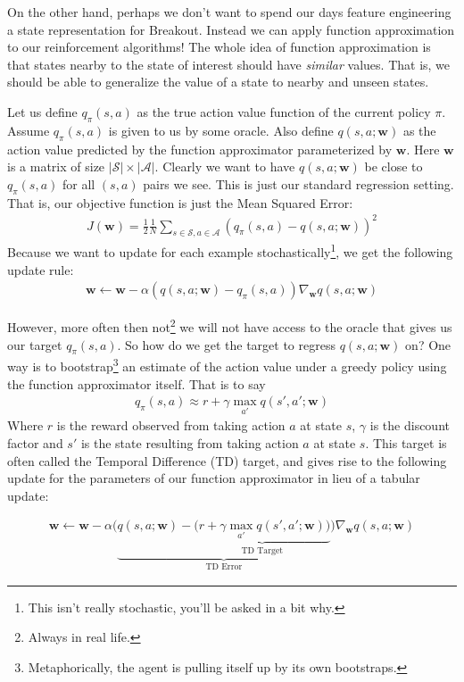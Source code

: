 \documentclass[11pt]{article}
\numberwithin{equation}{section} %
\numberwithin{figure}{section} %
\numberwithin{table}{section} %
\newcommand{\wv}{\mathbf{w}}
\begin{document}
On the other hand, perhaps we don't want to spend our days feature engineering a state representation for Breakout. Instead we can apply function approximation to our reinforcement algorithms! The whole idea of function approximation is that states nearby to the state of interest should have \emph{similar} values. That is, we should be able to generalize the value of a state to nearby and unseen states.

Let us define $q_\pi(s, a)$ as the true action value function of the current policy $\pi$. Assume $q_\pi(s,a)$ is given to us by some oracle. Also define $q(s, a; \wv)$ as the action value predicted by the function approximator parameterized by $\wv$. Here $\wv$ is a matrix of size $|\mathcal{S}| \times |\mathcal{A}|$. Clearly we want to have $q(s, a; \wv)$ be close to $q_\pi(s, a)$ for all $(s, a)$ pairs we see. This is just our standard regression setting. That is, our objective function is just the Mean Squared Error:
\begin{align}
J(\wv) = \frac{1}{2} \frac{1}{N} \sum_{s\in\mathcal{S}, a\in\mathcal{A}} \left(q_\pi(s, a) - q(s, a; \wv) \right)^2
\end{align}
Because we want to update for each example stochastically\footnote{This isn't really stochastic, you'll be asked in a bit why.}, we get the following update rule:
\begin{align}
\wv \leftarrow \wv - \alpha \left(q(s, a; \wv) - q_\pi(s,a) \right) \nabla_\wv q(s, a; \wv)
\end{align}

However, more often then not\footnote{Always in real life.} we will not have access to the oracle that gives us our target $q_\pi(s, a)$. So how do we get the target to regress $q(s, a; \wv)$ on? One way is to bootstrap\footnote{Metaphorically, the agent is pulling itself up by its own bootstraps.} an estimate of the action value under a greedy policy using the function approximator itself. That is to say
\begin{align}
q_\pi (s, a) \approx r + \gamma \max_{a'} q(s', a'; \wv)
\end{align}
Where $r$ is the reward observed from taking action $a$ at state $s$, $\gamma$ is the discount factor and $s'$ is the state resulting from taking action $a$ at state $s$. This target is often called the Temporal Difference (TD) target, and gives rise to the following update for the parameters of our function approximator in lieu of a tabular update:

\begin{align}
\wv \leftarrow \wv - \alpha \bigg( \underbrace{q(s, a; \wv) - \underbrace{\big (r + \gamma \max_{a'}q(s', a'; \wv)\big)}_{\text{TD Target}}}_{\text{TD Error}} \bigg) \nabla_\wv q(s, a; \wv)
\end{align}
\end{document}
